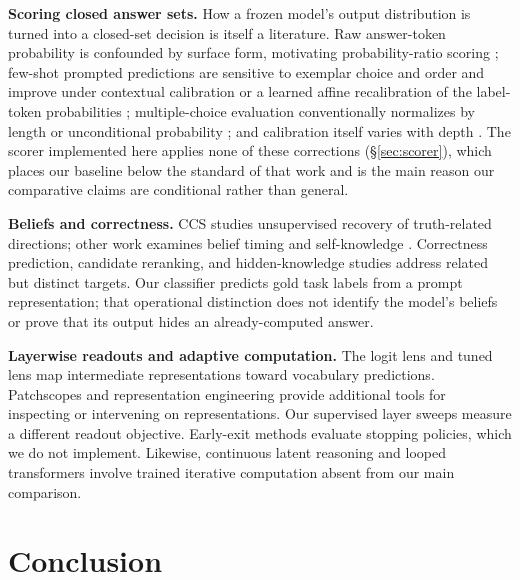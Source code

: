 \textbf{Scoring closed answer sets.} How a frozen model's output
distribution is turned into a closed-set decision is itself a literature.
Raw answer-token probability is confounded by surface form, motivating
probability-ratio scoring \citep{holtzman2021surface}; few-shot prompted
predictions are sensitive to exemplar choice and order and improve under
contextual calibration \citep{zhao2021calibrate} or a learned affine
recalibration of the label-token probabilities \citep{abbas2024linc};
multiple-choice evaluation conventionally normalizes by length or
unconditional probability \citep{brown2020gpt3}; and calibration itself
varies with depth \citep{joshi2025calibration}. The scorer implemented here
applies none of these corrections (\S\ref{sec:scorer}), which places our
baseline below the standard of that work and is the main reason our
comparative claims are conditional rather than general.

\textbf{Beliefs and correctness.} CCS \citep{burns2022ccs} studies
unsupervised recovery of truth-related directions; other work examines
belief timing and self-knowledge
\citep{cox2026precommitted,boppana2026theater,kadavath2022know}.
Correctness prediction, candidate reranking, and hidden-knowledge studies
\citep{orgad2025know,gekhman2025insideout,cencerrado2026noanswer,ni2026reprobe}
address related but distinct targets. Our classifier predicts gold task
labels from a prompt representation; that operational distinction does
not identify the model's beliefs or prove that its output hides an
already-computed answer.

\textbf{Layerwise readouts and adaptive computation.} The logit lens
\citep{nostalgebraist2020logitlens} and tuned lens
\citep{belrose2023tunedlens} map intermediate representations toward
vocabulary predictions. Patchscopes \citep{ghandeharioun2024patchscopes}
and representation engineering \citep{zou2023repeng} provide additional
tools for inspecting or intervening on representations. Our supervised
layer sweeps measure a different readout objective. Early-exit methods
\citep{xin2020deebert,zhou2020pabee,schuster2022calm,elhoushi2024layerskip}
evaluate stopping policies, which we do not implement. Likewise,
continuous latent reasoning and looped transformers
\citep{hao2024coconut,saunshi2025looped} involve trained iterative
computation absent from our main comparison.

\section{Conclusion}

